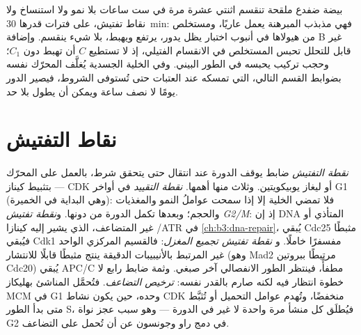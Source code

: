 \begin{example}\label{ex:b3:cell-cycle-apoptosis:frog}
بيضة ضفدع ملقحة تنقسم اثنتي عشرة مرة في ست ساعات بلا
نمو ولا استنساخ ولا نقاط تفتيش، على فترات قدرها
\qty{30}{min}: فهي مذبذب المبرهنة يعمل عاريًا، ومستخلص
من هيولاها في أنبوب اختبار يظل يدور،  يرتفع
ويهبط، بلا شيء ينقسم. وإضافة  B غير قابل للتحلل
تحبس المستخلص في الانقسام الفتيلي، إذ لا تستطيع $C$ أن تهبط دون $C_{1}$؛
وحجب تركيب  يحبسه في الطور البيني. وفي الخلية الجسدية
يُغلَّف المحرّك نفسه بضوابط القسم التالي، التي تمسكه
عند العتبات حتى تُستوفى الشروط، فيصير الدور
يومًا لا نصف ساعة ويمكن أن يطول بلا حد.
\end{example}

\section{نقاط التفتيش}

\begin{definition}\label{def:b3:cell-cycle-apoptosis:checkpoints}
\emph{نقطة التفتيش} ضابط يوقف الدورة عند انتقال
حتى يتحقق شرط، بالعمل على المحرّك --- بتثبيط
كيناز CDK أو ليغاز يوبيكويتين. وثلاث منها أهمها. \emph{نقطة
التقييد} في أواخر G1 (وهي البداية في الخميرة): فلا تمضي الخلية إلا إذا سمحت
عواملُ النمو والمغذيات والحجم؛ وبعدها تكمل الدورة
من دونها. و\emph{نقطة تفتيش G2/M}: إذ إن DNA المتأذي أو غير المتضاعف،
الذي يشير إليه كينازا /ATR في \cref{ch:b3:dna-repair}، يُبقي
Cdc25 مثبطًا فيُبقي Cdk1 مفسفرًا خاملًا. و
\emph{نقطة تفتيش تجميع المغزل}: فالقسيم المركزي الواحد غير المرتبط
بالأنيبيبات الدقيقة ينتج مثبطًا قابلًا للانتشار (وهو Mad2 مرتبطًا ببروتين Cdc20)
يُبقي APC/C مطفأً، فينتظر الطور الانفصالي آخر
صبغي. وثمة ضابط رابع لا خطوة انتظار فيه لكنه صارم
بالقدر نفسه: \emph{ترخيص التضاعف}. فتُحمَّل المناشئ بهليكاز
MCM في G1 وحده، حين يكون نشاط CDK منخفضًا، وتُهدم عوامل التحميل
أو تُثبَّط متى بدأ الطور S، فيُطلَق كل منشأ
مرة واحدة لا غير في الدورة --- وهو سبب عجز نواة G2 في دمج راو
وجونسون عن أن تُحمل على التضاعف.
\end{definition}

